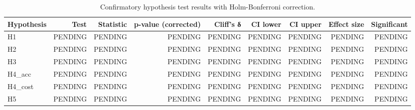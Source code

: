 \begin{table}[t]
  \centering
  \caption{Confirmatory hypothesis test results with Holm-Bonferroni correction.}
  \begin{tabular}{lrrrrrrrr}
    \hline
    Hypothesis & Test & Statistic & p-value (corrected) & Cliff's δ & CI lower & CI upper & Effect size & Significant \\
    \hline
    H1 & PENDING & PENDING & PENDING & PENDING & PENDING & PENDING & PENDING & PENDING \\
    H2 & PENDING & PENDING & PENDING & PENDING & PENDING & PENDING & PENDING & PENDING \\
    H3 & PENDING & PENDING & PENDING & PENDING & PENDING & PENDING & PENDING & PENDING \\
    H4\_acc & PENDING & PENDING & PENDING & PENDING & PENDING & PENDING & PENDING & PENDING \\
    H4\_cost & PENDING & PENDING & PENDING & PENDING & PENDING & PENDING & PENDING & PENDING \\
    H5 & PENDING & PENDING & PENDING & PENDING & PENDING & PENDING & PENDING & PENDING \\
    \hline
  \end{tabular}
\end{table}
